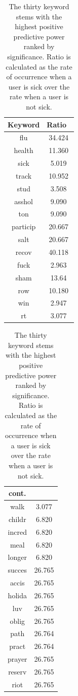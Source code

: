 \documentclass{acm_proc_article-sp}
\begin{document}
\begin{table}[!ht]
\centering
\begin{tabular}{|c|c|}\hline
Keyword&Ratio\ \\ \hline
flu &  34.424\\ \hline
health &  11.360\\ \hline
sick &  5.019\\ \hline
track & 10.952 \\ \hline
stud & 3.508 \\ \hline
asshol & 9.090 \\ \hline
ton & 9.090 \\ \hline
particip & 20.667 \\ \hline
salt & 20.667 \\ \hline
recov & 40.118 \\ \hline
fuck & 2.963 \\ \hline
sham & 13.64 \\ \hline
row & 10.180 \\ \hline
win & 2.947 \\ \hline
rt & 3.077 \\ \hline
  \end{tabular}
  \hspace{1em}
\begin{tabular}{|c|c|}\hline
cont. & \\ \hline
walk & 3.077 \\ \hline
childr & 6.820 \\ \hline
incred & 6.820 \\ \hline
meal & 6.820 \\ \hline
longer &  6.820 \\ \hline
succes &  26.765 \\ \hline
accis & 26.765 \\ \hline
holida & 26.765 \\ \hline
luv & 26.765 \\ \hline
oblig & 26.765 \\ \hline
path & 26.764 \\ \hline
pract & 26.764 \\ \hline
prayer & 26.765 \\ \hline
reserv & 26.765 \\ \hline
riot & 26.765 \\ 
\hline\end{tabular}
\caption{The thirty keyword stems with the highest positive predictive power ranked by significance. Ratio is calculated as the rate of occurrence when a user is sick over the rate when a user is not sick.}
\label{tab:thirty_best}
\end{table}


\balancecolumns

\end{document}
